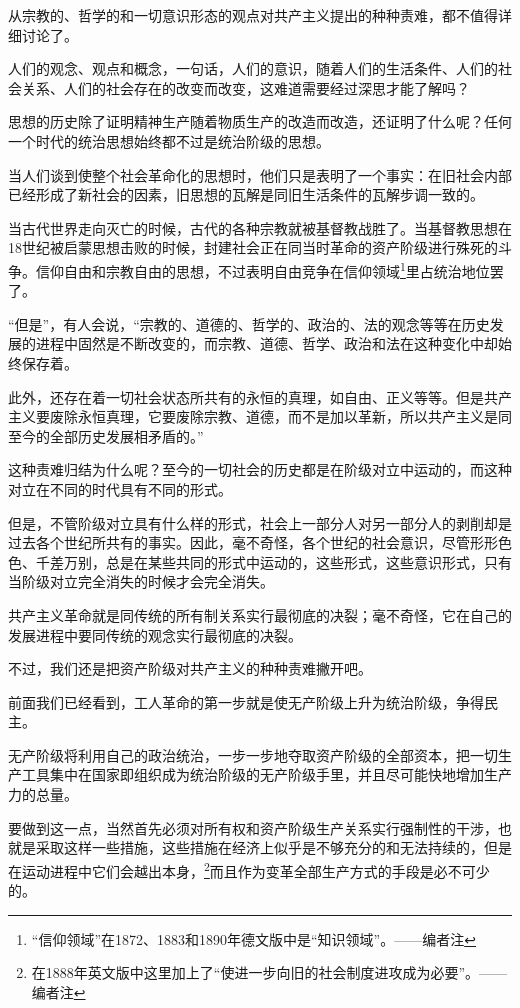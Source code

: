 \documentclass[UTF8,zihao=-4,a4paper]{ctexart}
\begin{document}
从宗教的、哲学的和一切意识形态的观点对共产主义提出的种种责难，都不值得详细讨论了。\par
人们的观念、观点和概念，一句话，人们的意识，随着人们的生活条件、人们的社会关系、人们的社会存在的改变而改变，这难道需要经过深思才能了解吗？\par
思想的历史除了证明精神生产随着物质生产的改造而改造，还证明了什么呢？任何一个时代的统治思想始终都不过是统治阶级的思想。\par
当人们谈到使整个社会革命化的思想时，他们只是表明了一个事实：在旧社会内部已经形成了新社会的因素，旧思想的瓦解是同旧生活条件的瓦解步调一致的。\par
当古代世界走向灭亡的时候，古代的各种宗教就被基督教战胜了。当基督教思想在18世纪被启蒙思想击败的时候，封建社会正在同当时革命的资产阶级进行殊死的斗争。信仰自由和宗教自由的思想，不过表明自由竞争在信仰领域\footnote{“信仰领域”在1872、1883和1890年德文版中是“知识领域”。——编者注}里占统治地位罢了。\par
“但是”，有人会说，“宗教的、道德的、哲学的、政治的、法的观念等等在历史发展的进程中固然是不断改变的，而宗教、道德、哲学、政治和法在这种变化中却始终保存着。\par
此外，还存在着一切社会状态所共有的永恒的真理，如自由、正义等等。但是共产主义要废除永恒真理，它要废除宗教、道德，而不是加以革新，所以共产主义是同至今的全部历史发展相矛盾的。”\par
这种责难归结为什么呢？至今的一切社会的历史都是在阶级对立中运动的，而这种对立在不同的时代具有不同的形式。\par
但是，不管阶级对立具有什么样的形式，社会上一部分人对另一部分人的剥削却是过去各个世纪所共有的事实。因此，毫不奇怪，各个世纪的社会意识，尽管形形色色、千差万别，总是在某些共同的形式中运动的，这些形式，这些意识形式，只有当阶级对立完全消失的时候才会完全消失。\par
共产主义革命就是同传统的所有制关系实行最彻底的决裂；毫不奇怪，它在自己的发展进程中要同传统的观念实行最彻底的决裂。\par
不过，我们还是把资产阶级对共产主义的种种责难撇开吧。\par
前面我们已经看到，工人革命的第一步就是使无产阶级上升为统治阶级，争得民主。\par
无产阶级将利用自己的政治统治，一步一步地夺取资产阶级的全部资本，把一切生产工具集中在国家即组织成为统治阶级的无产阶级手里，并且尽可能快地增加生产力的总量。\par
要做到这一点，当然首先必须对所有权和资产阶级生产关系实行强制性的干涉，也就是采取这样一些措施，这些措施在经济上似乎是不够充分的和无法持续的，但是在运动进程中它们会越出本身，\footnote{在1888年英文版中这里加上了“使进一步向旧的社会制度进攻成为必要”。——编者注}而且作为变革全部生产方式的手段是必不可少的。\par
\end{document}
